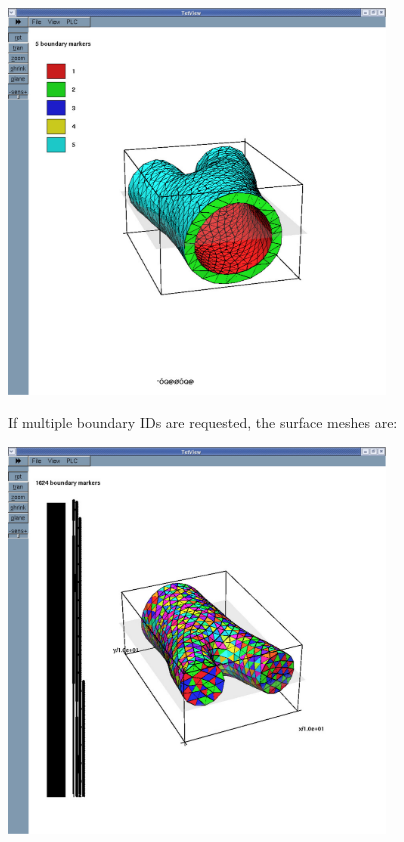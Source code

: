 \begin{DoxyImageNoCaption}
  \mbox{\includegraphics[width=0.75\textwidth]{solid2}}
\end{DoxyImageNoCaption}






If multiple boundary I\+Ds are requested, the surface meshes are\+:

 
\begin{DoxyImage}
\includegraphics[width=0.75\textwidth]{fluid_mult_ids}
\end{DoxyImage}



